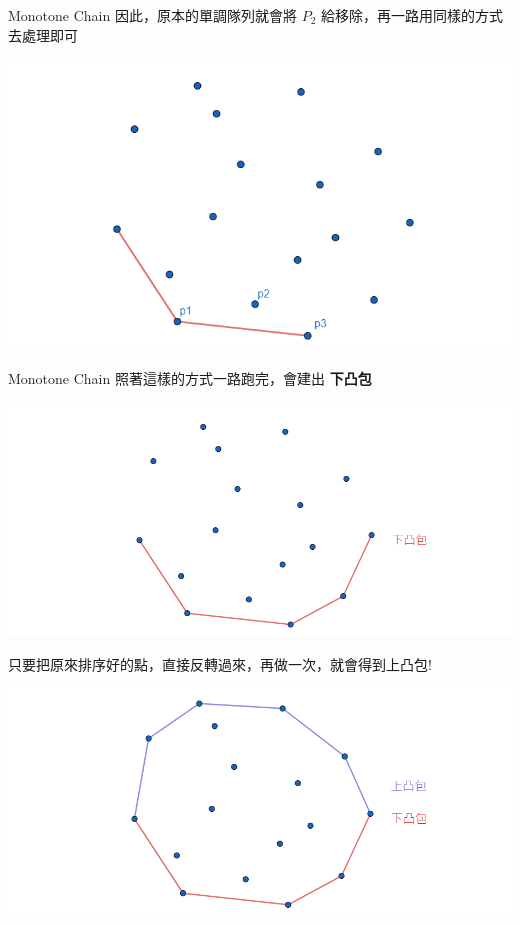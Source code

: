 \documentclass[aspectratio=169]{beamer}
\begin{document}
\begin{frame}[fragile]{Monotone Chain}
    因此，原本的單調隊列就會將 $P_2$ 給移除，再一路用同樣的方式去處理即可
    \begin{center}
        \includegraphics[scale=0.3]{images/monotone_chain_3.png}
    \end{center}
\end{frame}

\begin{frame}[fragile]{Monotone Chain}
    照著這樣的方式一路跑完，會建出 \textbf{下凸包}
    \begin{center}
        \includegraphics[scale=0.25]{images/bottom_convex_hull.png}
    \end{center} \pause
    只要把原來排序好的點，直接反轉過來，再做一次，就會得到上凸包!
    \begin{center}
        \includegraphics[scale=0.25]{images/upper_convex_hull.png}
    \end{center}
\end{frame}
\end{document}

